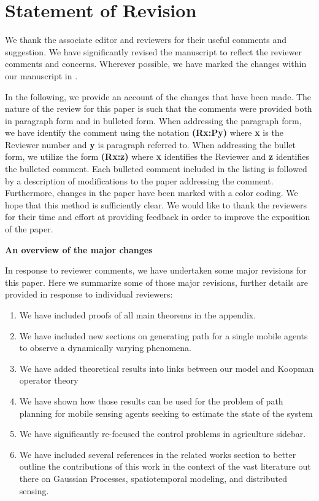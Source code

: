 \documentclass{letter}
\newcommand{\rr}[1]{{\bf \color{blue}{#1}}}
\begin{document}
\section{Statement of Revision}

We thank the associate editor and reviewers for their useful comments and suggestion. We have significantly revised the manuscript to reflect the reviewer comments and concerns. Wherever possible, we have marked the changes within our manuscript in \rr{blue}.

In the following, we provide an account of the changes that have been made.  The nature of
the review for this paper is such that the comments were provided both
in paragraph form and in bulleted form.  When addressing the paragraph
form, we have identify the comment using the notation {\bf {\color{red}(Rx:Py)}} where 
{\bf x} is the Reviewer number and {\bf y} is paragraph referred to.
When addressing the bullet form, we utilize the form {\bf (Rx:z)} where
{\bf x} identifies the Reviewer and {\bf z} identifies the bulleted comment.
Each bulleted comment included in the listing is followed by a description
of modifications to the paper addressing the comment. Furthermore, changes in the paper have been marked with a color coding.  We hope that this
method is sufficiently clear.
We would like to thank the reviewers for their time and effort at providing
feedback in order to improve the exposition of the paper.

\noindent\textbf{An overview of the major changes}

In response to reviewer comments, we have undertaken some major revisions for this paper. Here we summarize some of those major revisions, further details are provided in response to individual reviewers:

\begin{enumerate}
\item We have included proofs of all main theorems in the appendix.
\item We have included new sections on generating path for a single mobile agents to observe a dynamically varying phenomena.
\item We have added theoretical results into links between our model and Koopman operator theory
\item We have shown how those results can be used for the problem of path planning for mobile sensing agents seeking to estimate the state of the system
\item We have significantly re-focused the control problems in agriculture sidebar.
\item We have included several references in the related works section to better outline the contributions of this work in the context of the vast literature out there on Gaussian Processes, spatiotemporal modeling, and distributed sensing.
\end{enumerate}
\end{document}
